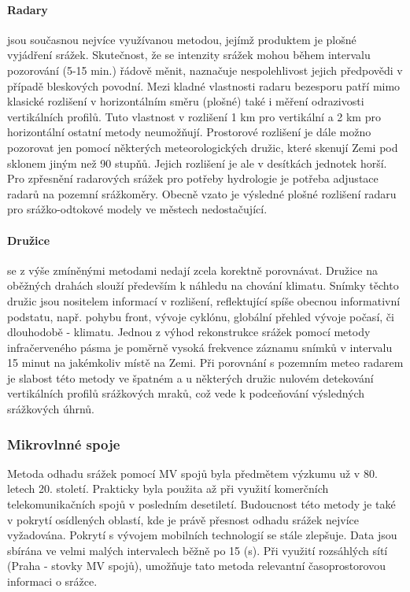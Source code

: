 \documentclass[a4paper,12pt,oneside]{report}
\begin{document}
\paragraph*{Radary}
jsou současnou nejvíce využívanou metodou, jejímž produktem je plošné vyjádření srážek.
Skutečnost, že se intenzity srážek mohou během intervalu 
pozorování (5-15 min.) řádově měnit, naznačuje nespolehlivost jejich předpovědi 
v případě bleskových povodní. Mezi kladné vlastnosti radaru
bezesporu patří mimo klasické rozlišení v horizontálním směru (plošné)
také i měření odrazivosti vertikálních profilů. Tuto vlastnost v
rozlišení 1 km pro vertikální a 2 km pro horizontální ostatní metody
neumožňují. Prostorové rozlišení je dále možno pozorovat jen pomocí
některých meteorologických družic, které skenují Zemi pod sklonem
jiným než 90 stupňů. Jejich rozlišení je ale v desítkách jednotek
horší. Pro zpřesnění radarových srážek pro potřeby hydrologie je
potřeba adjustace radarů na pozemní srážkoměry. Obecně vzato je
výsledné plošné rozlišení radaru pro srážko-odtokové modely
 ve městech nedostačující.

\paragraph*{Družice} se z výše zmíněnými metodami nedají zcela
korektně porovnávat. Družice na oběžných drahách slouží především k
náhledu na chování klimatu. Snímky těchto družic jsou nositelem
informací v rozlišení, reflektující spíše obecnou informativní
podstatu, např. pohybu front, vývoje cyklónu, globální přehled vývoje
počasí, či dlouhodobě - klimatu.  Jednou z výhod rekonstrukce srážek
pomocí metody infračerveného pásma je poměrně vysoká frekvence záznamu
snímků v intervalu 15 minut na jakémkoliv místě na Zemi. Při porovnání
s pozemním meteo radarem je slabost této metody ve špatném a u
některých družic nulovém detekování vertikálních profilů srážkových
mraků, což vede k podceňování výsledných srážkových úhrnů.


\subsubsection{Mikrovlnné spoje}
Metoda odhadu srážek pomocí MV spojů byla předmětem výzkumu už v
80. letech 20. století. Prakticky byla použita až při využití
komerčních telekomunikačních spojů v posledním desetiletí. Budoucnost
této metody je také v pokrytí osídlených oblastí, kde je právě
přesnost odhadu srážek nejvíce vyžadována. Pokrytí s vývojem mobilních
technologií se stále zlepšuje. Data jsou sbírána ve velmi malých
intervalech běžně po 15 (s). Při využití rozsáhlých sítí (Praha - stovky
MV spojů), umožňuje tato metoda relevantní časoprostorovou informaci o
srážce.
 
\end{document}
